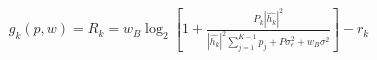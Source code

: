 \documentclass[preview]{standalone}
\begin{document}
\begin{align*}
g_k(p,w) = R_k = w_B \log_2 \left[1 + \frac{P_k \left|\hat{h_k}\right|^2}{\left|\hat{h_k}\right|^2 \sum_{j=1}^{K-1} {p_j} + P \sigma_{\epsilon}^2 + w_B \sigma^2}\right] - r_k
\end{align*}
\end{document}
